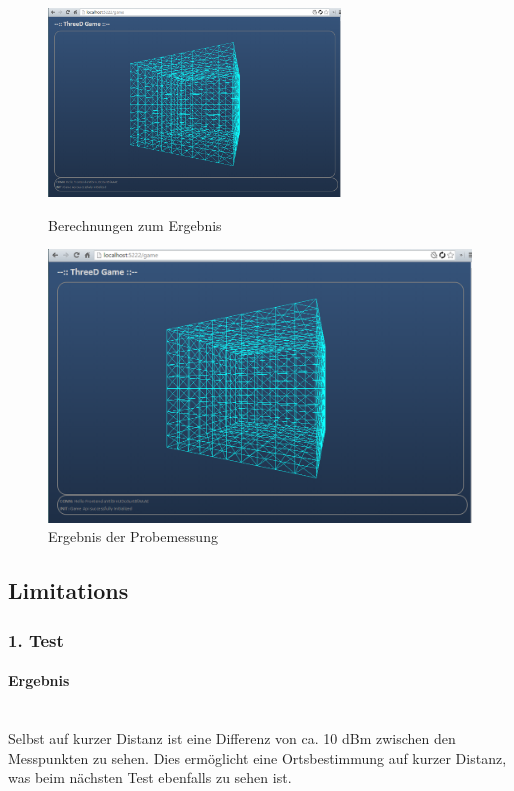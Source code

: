 \documentclass[a4paper]{spie}  %
\begin{document}
\begin{figure}[H]
\begin{minipage}[t]{0.4\textwidth}
\vspace{0pt}
\includegraphics[height=5cm]{./images/FrontendInit.png}
\caption{Berechnungen zum Ergebnis}
\label{fig:tablleMessung}
\end{minipage}
\hfill
\begin{minipage}[t]{0.5\textwidth}
\vspace{0pt}
		\includegraphics[width=\textwidth]{./images/FrontendInit.png}
		\caption{Ergebnis der Probemessung}
		\label{fig:test1}
\end{minipage}
\end{figure}

\subsection{Limitations}
\subsubsection{1. Test}

\paragraph{Ergebnis}\mbox{}\\
Selbst auf kurzer Distanz ist eine Differenz von ca. 10 dBm zwischen den Messpunkten zu sehen. Dies ermöglicht eine Ortsbestimmung auf kurzer Distanz, was beim nächsten Test ebenfalls zu sehen ist.
\end{document}
